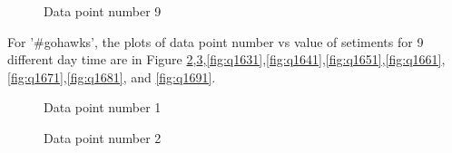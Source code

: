 \documentclass{article}
\begin{document}
\begin{figure}
\centering
{}
\caption{Data point number 9} \label{fig:q169}
\end{figure}


For '#gohawks', the plots of data point number vs value of setiments for 9 different day time are in Figure \ref{fig:q1611},\ref{fig:q1621},\ref{fig:q1631},\ref{fig:q1641},\ref{fig:q1651},\ref{fig:q1661},\ref{fig:q1671},\ref{fig:q1681}, and \ref{fig:q1691}.\\


\begin{figure}
\centering
{}
\caption{Data point number 1} \label{fig:q1611}
\end{figure}

\begin{figure}
\centering
{}
\caption{Data point number 2} \label{fig:q1621}
\end{figure}
\end{document}
